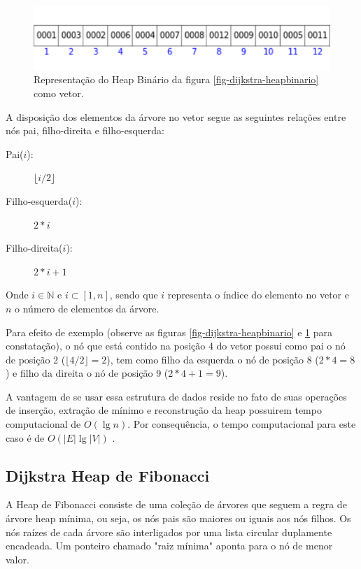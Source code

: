 \begin{figure}[H]
\centering
\includegraphics[width=.60\textwidth]{figuras/Heap-vetor}
\caption{Representação do Heap Binário da figura \ref{fig-dijkstra-heapbinario} como vetor.}
\label{fig-dijkstra-heapvetor}
\end{figure}

A disposição dos elementos da árvore no vetor segue as seguintes relações entre nós pai, filho-direita e filho-esquerda:
\begin{description}
\item[Pai($i$):] $\lfloor i/2 \rfloor$
\item[Filho-esquerda($i$):] $2*i$
\item[Filho-direita($i$):] $2*i+1$
\end{description}
Onde $i \in \mathbb{N}$ e $i \subset [1, n]$, sendo que $i$ representa o índice do elemento no vetor e $n$ o número de elementos da árvore.

 Para efeito de exemplo (observe as figuras \ref{fig-dijkstra-heapbinario} e \ref{fig-dijkstra-heapvetor} para constatação), o nó que está contido na posição 4 do vetor possui como pai o nó de posição 2 ($\lfloor 4 / 2 \rfloor = 2$), tem como filho da esquerda o nó de posição 8 ($2*4 = 8$) e filho da direita o nó de posição 9 ($2*4+1 = 9$).


A vantagem de se usar essa estrutura de dados reside no fato de suas operações de inserção, extração de mínimo e reconstrução da heap possuirem tempo computacional de $O(\lg n)$. Por consequência, o tempo computacional para este caso é de $O(|E| \lg |V|)$ \cite{cormen2009introduction}.

\subsection{Dijkstra Heap de Fibonacci}
\label{sec-dijkstra-versoes-fibonacci}
A Heap de Fibonacci consiste de uma coleção de árvores que seguem a regra de árvore heap mínima, ou seja, os nós pais são maiores ou iguais aos nós filhos. Os nós raízes de cada árvore são interligados por uma lista circular duplamente encadeada. Um ponteiro chamado "raiz mínima" aponta para o nó de menor valor.

